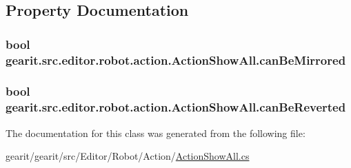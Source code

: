\subsection{Property Documentation}
\hypertarget{classgearit_1_1src_1_1editor_1_1robot_1_1action_1_1_action_show_all_ae5bda02fd6286a0191d244cdbe98e862}{
\subsubsection[{can\+Be\+Mirrored}]{\setlength{\rightskip}{0pt plus 5cm}bool gearit.\+src.\+editor.\+robot.\+action.\+Action\+Show\+All.\+can\+Be\+Mirrored\hspace{0.3cm}{\ttfamily [get]}}}\label{classgearit_1_1src_1_1editor_1_1robot_1_1action_1_1_action_show_all_ae5bda02fd6286a0191d244cdbe98e862}
\hypertarget{classgearit_1_1src_1_1editor_1_1robot_1_1action_1_1_action_show_all_a3d3b861f0563fbe6b999f44d324c2e4b}{
\subsubsection[{can\+Be\+Reverted}]{\setlength{\rightskip}{0pt plus 5cm}bool gearit.\+src.\+editor.\+robot.\+action.\+Action\+Show\+All.\+can\+Be\+Reverted\hspace{0.3cm}{\ttfamily [get]}}}\label{classgearit_1_1src_1_1editor_1_1robot_1_1action_1_1_action_show_all_a3d3b861f0563fbe6b999f44d324c2e4b}


The documentation for this class was generated from the following file\+:\begin{DoxyCompactItemize}
\item 
gearit/gearit/src/\+Editor/\+Robot/\+Action/\hyperlink{_action_show_all_8cs}{Action\+Show\+All.\+cs}\end{DoxyCompactItemize}
